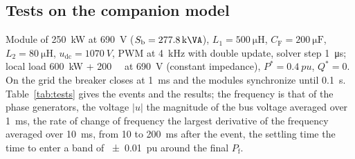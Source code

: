 \documentclass[11pt,a4paper]{scrartcl}
\newcommand{\ped}[1]{_{\mathrm{#1}}}
\begin{document}
\begin{onehalfspace}
\subsection{Tests on the companion model}
\label{sec:tests}

Module of \SI{250}{\kilo\watt} at \SI{690}{V} ($S\ped{b} = \SI{277.8}{\kilo\VA}$), $L_1 = \SI{500}{\micro\henry}$, $C\ped{F} = \SI{200}{\micro\farad}$, $L_2 = \SI{80}{\micro\henry}$, $u\ped{dc} = \SI{1070}{V}$, PWM at \SI{4}{kHz} with double update, solver step \SI{1}{\micro\second}; local load \SI{600}{\kilo\watt} + \SI{200}{\kilo\var} at \SI{690}{V} (constant impedance), $P^* = \SI{0.4}{pu}$, $Q^* = 0$. On the grid the breaker closes at \SI{1}{ms} and the modules synchronize until \SI{0.1}{s}. Table~\ref{tab:tests} gives the events and the results; the frequency is that of the phase generators, the voltage $|u|$ the magnitude of the bus voltage averaged over \SI{1}{ms}, the rate of change of frequency the largest derivative of the frequency averaged over \SI{10}{ms}, from 10 to \SI{200}{ms} after the event, the settling time the time to enter a band of \SI{\pm 0.01}{pu} around the final $P\ped{f}$.


\end{onehalfspace}
\end{document}
